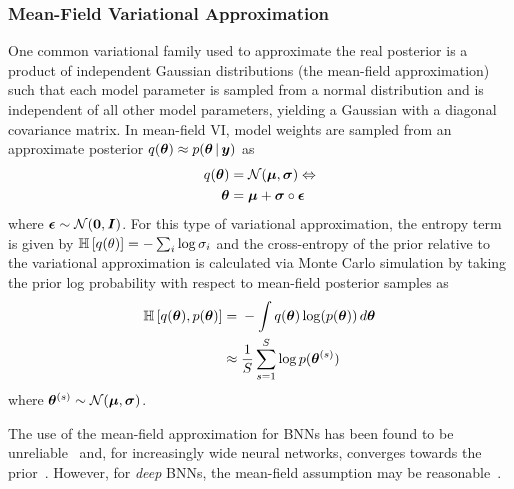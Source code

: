 \documentclass[10pt,a4paper,twocolumn]{article}
\begin{document}
\subsubsection{Mean-Field Variational Approximation}\label{ssec:mfvi}
One common variational family used to approximate the real posterior is a product of independent Gaussian distributions (the mean-field approximation) such that each model parameter is sampled from a normal distribution and is independent of all other model parameters, yielding a Gaussian with a diagonal covariance matrix.
In mean-field VI, model weights are sampled from an approximate posterior \(q(\bm \theta) \approx p(\bm{\theta} \, | \, \bm y)\) as
\begin{align}
    q(\bm \theta) ={} & \mathcal{N}(\bm \mu, \bm \sigma) \Leftrightarrow \nonumber         \\
    \bm{\theta} ={}   & \bm{\mu} + \bm{\sigma} \circ \bm{\epsilon}\label{eq:meanfield}
\end{align}
where \(\bm{\epsilon} \sim \mathcal{N}(\bm 0, \bm{I})\).
For this type of variational approximation, the entropy term is given by \(\mathbb{H}\left[q(\theta)\right] = - \sum_i \log \sigma_i\) and the cross-entropy of the prior relative to the variational approximation is calculated via Monte Carlo simulation by taking the prior log probability with respect to mean-field posterior samples as
\begin{align}
    \mathbb{H}\left[q(\bm\theta), p(\bm\theta)\right] ={} & - \int q(\bm\theta) \log(p(\bm\theta))\,d\bm\theta \nonumber \\
    \approx{}                                     & \frac{1}{S} \sum^S_{s=1} \log p(\bm{\theta}^{(s)})
\end{align}
where \(\bm{\theta}^{(s)} \sim \mathcal{N}(\bm{\mu}, \bm{\sigma})\).

The use of the mean-field approximation for BNNs has been found to be unreliable~\cite{wu2018deterministic} and, for increasingly wide neural networks, converges towards the prior~\cite{coker2021wide}.
However, for \emph{deep} BNNs, the mean-field assumption may be reasonable~\cite{farquhar2020liberty}.
\end{document}
